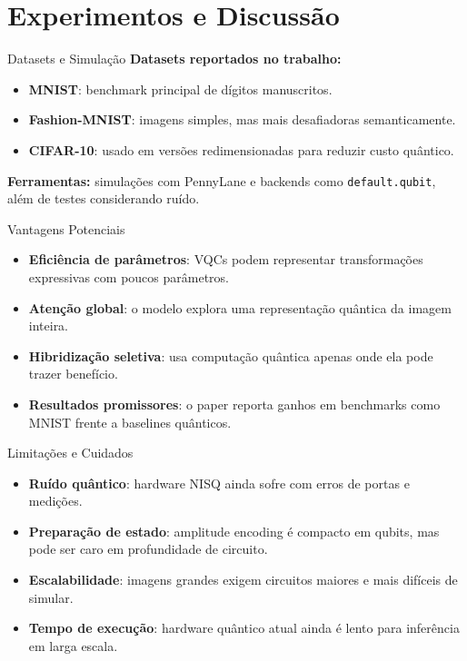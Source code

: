 \section{Experimentos e Discussão}

\begin{frame}{Datasets e Simulação}
    \textbf{Datasets reportados no trabalho:}
    \begin{itemize}
        \item \textbf{MNIST}: benchmark principal de dígitos manuscritos.
        \item \textbf{Fashion-MNIST}: imagens simples, mas mais desafiadoras semanticamente.
        \item \textbf{CIFAR-10}: usado em versões redimensionadas para reduzir custo quântico.
    \end{itemize}
    \vspace{0.3em}
    \textbf{Ferramentas:} simulações com PennyLane e backends como \texttt{default.qubit}, além de testes considerando ruído.
\end{frame}

\begin{frame}{Vantagens Potenciais}
    \begin{itemize}
        \item \textbf{Eficiência de parâmetros}: VQCs podem representar transformações expressivas com poucos parâmetros.
        \item \textbf{Atenção global}: o modelo explora uma representação quântica da imagem inteira.
        \item \textbf{Hibridização seletiva}: usa computação quântica apenas onde ela pode trazer benefício.
        \item \textbf{Resultados promissores}: o paper reporta ganhos em benchmarks como MNIST frente a baselines quânticos.
    \end{itemize}
\end{frame}

\begin{frame}{Limitações e Cuidados}
    \begin{itemize}
        \item \textbf{Ruído quântico}: hardware NISQ ainda sofre com erros de portas e medições.
        \item \textbf{Preparação de estado}: amplitude encoding é compacto em qubits, mas pode ser caro em profundidade de circuito.
        \item \textbf{Escalabilidade}: imagens grandes exigem circuitos maiores e mais difíceis de simular.
        \item \textbf{Tempo de execução}: hardware quântico atual ainda é lento para inferência em larga escala.
    \end{itemize}
\end{frame}

